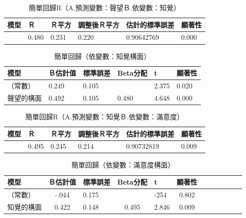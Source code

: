 \begin{table}[htb]
\caption{簡單回歸R（A.預測變數：聲望Ｂ.依變數：知覺）}
\label{tab:R3}
\renewcommand{\arraystretch}{1.2} %
\arrayrulewidth=1pt               %
\tabcolsep=10pt                   %
\begin{tabular}[t]{llllll}  %
\hline
 模型&Ｒ&Ｒ平方&調整後Ｒ平方&估計的標準誤差&顯著性\\
\hline
&0.480&0.231&0.220&0.90642769&0.000\\
\hline
\end{tabular}
\end{table}

\begin{table}[htb]
\caption{簡單回歸（依變數：知覺構面）}
\label{tab:H3}
\renewcommand{\arraystretch}{1.2} %
\arrayrulewidth=1pt               %
\tabcolsep=10pt                   %
\begin{tabular}[t]{llllll}  %
\hline
 模型&Ｂ估計值&標準誤差&Beta分配&t&顯著性\\
\hline
（常數）&0.249&0.105&&2.375&0.020\\
聲望的構面&0.492&0.105&0.480&4.648&0.000\\
\hline
\end{tabular}
\end{table}

\begin{table}[htb]
\caption{簡單回歸R（A.預測變數：知覺Ｂ.依變數：滿意度）}
\label{tab:R3}
\renewcommand{\arraystretch}{1.2} %
\arrayrulewidth=1pt               %
\tabcolsep=10pt                   %
\begin{tabular}[t]{llllll}  %
\hline
 模型&Ｒ&Ｒ平方&調整後Ｒ平方&估計的標準誤差&顯著性\\
\hline
&0.495&0.245&0.214&0.90732819&0.009\\
\hline
\end{tabular}
\end{table}

\begin{table}[htb]
\caption{簡單回歸（依變數：滿意度構面）}
\label{tab:H4}
\renewcommand{\arraystretch}{1.2} %
\arrayrulewidth=1pt               %
\tabcolsep=10pt                   %
\begin{tabular}[t]{lclclclclclc|}  %
\hline
 模型&Ｂ估計值&標準誤差&Beta分配&t&顯著性\\
\hline
（常數）&-.044&0.175&&-254&0.802\\
知覺的構面&0.422&0.148&0.495&2.846&0.009\\
\hline
\end{tabular}
\end{table}


